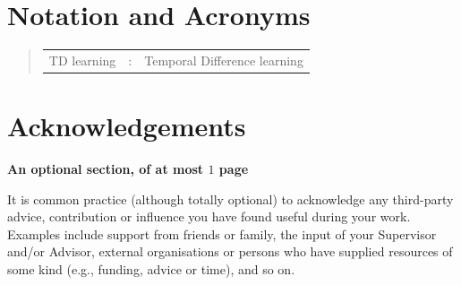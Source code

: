 \documentclass[ %
                    author={Callum Pearce},
                supervisor={Dr. Neill Campbell},
                    degree={MEng},
                     title={How effective are Temporal difference learning methods for reducing the number of zero contribution light paths, while still accurately approximating Global Illumination in Path tracing?},
                  subtitle={},
                      type={research},
                      year={2019} ]{dissertation}
\begin{document}

\chapter*{Notation and Acronyms}

\begin{quote}
\noindent
\begin{tabular}{lcl}
TD learning    &:    & Temporal Difference learning\\
\end{tabular}
\end{quote}


\chapter*{Acknowledgements}

{\bf An optional section, of at most $1$ page}
\vspace{1cm} 

\noindent
It is common practice (although totally optional) to acknowledge any
third-party advice, contribution or influence you have found useful
during your work.  Examples include support from friends or family, 
the input of your Supervisor and/or Advisor, external organisations 
or persons who  have supplied resources of some kind (e.g., funding, 
advice or time), and so on.
\end{document}
